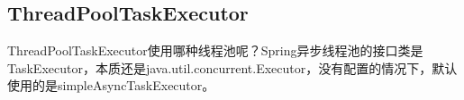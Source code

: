 \documentclass[../../../interview-questions.tex]{subfiles}
\begin{document}
\subsection{ThreadPoolTaskExecutor}

ThreadPoolTaskExecutor使用哪种线程池呢？Spring异步线程池的接口类是TaskExecutor，本质还是java.util.concurrent.Executor，没有配置的情况下，默认使用的是simpleAsyncTaskExecutor。
\end{document}
